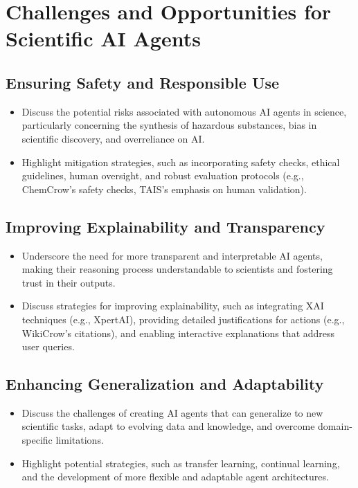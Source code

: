 \documentclass{article}
\begin{document}
\section{Challenges and Opportunities for Scientific AI Agents}

\subsection{Ensuring Safety and Responsible Use}
\begin{itemize}
    \item Discuss the potential risks associated with autonomous AI agents in science, particularly concerning the synthesis of hazardous substances, bias in scientific discovery, and overreliance on AI.
    \item Highlight mitigation strategies, such as incorporating safety checks, ethical guidelines, human oversight, and robust evaluation protocols (e.g., ChemCrow's safety checks, TAIS's emphasis on human validation).
\end{itemize}

\subsection{Improving Explainability and Transparency}
\begin{itemize}
    \item Underscore the need for more transparent and interpretable AI agents, making their reasoning process understandable to scientists and fostering trust in their outputs.
    \item Discuss strategies for improving explainability, such as integrating XAI techniques (e.g., XpertAI), providing detailed justifications for actions (e.g., WikiCrow's citations), and enabling interactive explanations that address user queries.
\end{itemize}

\subsection{Enhancing Generalization and Adaptability}
\begin{itemize}
    \item Discuss the challenges of creating AI agents that can generalize to new scientific tasks, adapt to evolving data and knowledge, and overcome domain-specific limitations.
    \item Highlight potential strategies, such as transfer learning, continual learning, and the development of more flexible and adaptable agent architectures.
\end{itemize}
\end{document}
